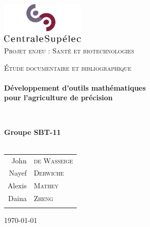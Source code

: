 \begin{titlepage}
\begin{center}
  
\includegraphics[width=0.3\textwidth]{./img/logo_centralesup.jpg}~\\[1cm]

\textsc{\Large Projet enjeu : Santé et biotechnologies}\\[0.5cm]

\vfill

\textsc{\Large \'Etude documentaire et bibliographique}\\[1.5cm] 

\HRule \\[0.4cm]
{ \LARGE \bfseries Développement d'outils mathématiques \\ 
   pour l'agriculture de précision \\[0.4cm] }

\HRule \\[1.5cm]

\vfill

{\large
\begin{center}
  \textbf{Groupe SBT-11} \\~\\
\begin{tabular}{rl}
    \quad John &\textsc{de Wasseige} \\
    \quad Nayef &\textsc{Derwiche} \\
    \quad Alexis &\textsc{Mathey} \\
    \quad Daina &\textsc{Zheng} \\ \\
\end{tabular}
\end{center}
}

\vfill

{\large \today}

\end{center}
\end{titlepage}